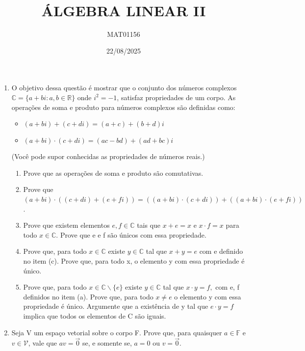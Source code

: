 \documentclass[12pt]{article}
\title{ÁLGEBRA LINEAR II}
\author{MAT01156}
\date{22/08/2025}
\begin{document}
\maketitle

\begin{enumerate}
    \item O objetivo dessa questão é mostrar que o conjunto dos números complexos $\mathbb{C}=\{a+bi : a,b \in \mathbb{R}\}$ onde $i^{2}=-1$, satisfaz propriedades de um corpo. As operações de soma e produto para números complexos são definidas como:
    \begin{itemize}
        \item[(i)] $(a+bi)+(c+di)=(a+c)+(b+d)i$
        \item[(ii)] $(a+bi)\cdot(c+di)=(ac-bd)+(ad+bc)i$
    \end{itemize}
    (Você pode supor conhecidas as propriedades de números reais.)
    \begin{enumerate}
        \item Prove que as operações de soma e produto são comutativas.
        \item Prove que $(a+bi)\cdot((c+di)+(e+fi))=((a+bi)\cdot(c+di))+((a+bi)\cdot(e+fi))$.
        \item Prove que existem elementos $e, f \in \mathbb{C}$ tais que $x+e=x$ e $x\cdot f=x$ para todo $x \in \mathbb{C}$. Prove que e e f são únicos com essa propriedade.
        \item Prove que, para todo $x \in \mathbb{C}$ existe $y \in \mathbb{C}$ tal que $x+y=e$ com e definido no item (c). Prove que, para todo x, o elemento y com essa propriedade é único.
        \item Prove que, para todo $x \in \mathbb{C}\backslash\{e\}$ existe $y \in \mathbb{C}$ tal que $x\cdot y=f,$ com e, f definidos no item (a). Prove que, para todo $x \ne e$ o elemento y com essa propriedade é único. Argumente que a existência de y tal que $e \cdot y = f$ implica que todos os elementos de C são iguais.
    \end{enumerate}

    \item Seja V um espaço vetorial sobre o corpo F. Prove que, para quaisquer $a \in \mathbb{F}$ e $v \in \mathcal{V}$, vale que $av=\vec{0}$ se, e somente se, $a=0$ ou $v=\vec{0}$.


\end{enumerate}
\end{document}
